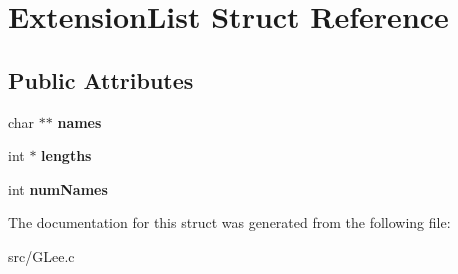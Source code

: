 \hypertarget{struct_extension_list}{\section{Extension\+List Struct Reference}
\label{struct_extension_list}
}
\subsection*{Public Attributes}
\begin{DoxyCompactItemize}
\item 
\hypertarget{struct_extension_list_a4ca8feba3982178f2cfdcc80d3a1bafc}{char $\ast$$\ast$ {\bfseries names}}\label{struct_extension_list_a4ca8feba3982178f2cfdcc80d3a1bafc}

\item 
\hypertarget{struct_extension_list_a187eb145322e0ec04fc4842054037aad}{int $\ast$ {\bfseries lengths}}\label{struct_extension_list_a187eb145322e0ec04fc4842054037aad}

\item 
\hypertarget{struct_extension_list_afbdc52d0b276a429ad3b31c9ba855531}{int {\bfseries num\+Names}}\label{struct_extension_list_afbdc52d0b276a429ad3b31c9ba855531}

\end{DoxyCompactItemize}


The documentation for this struct was generated from the following file\+:\begin{DoxyCompactItemize}
\item 
src/G\+Lee.\+c\end{DoxyCompactItemize}
